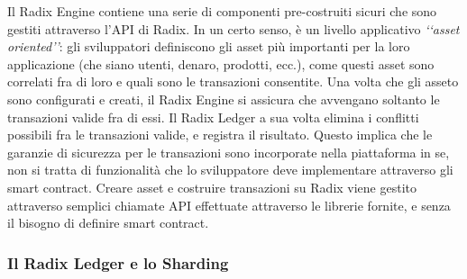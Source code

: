Il Radix Engine contiene una serie di componenti pre-costruiti sicuri che sono gestiti attraverso l'API di Radix. In un certo senso, è un livello applicativo \textit{‘‘asset oriented’’}: gli sviluppatori definiscono gli asset più importanti per la loro applicazione (che siano utenti, denaro, prodotti, ecc.), come questi asset sono correlati fra di loro e quali sono le transazioni consentite. Una volta che gli asseto sono configurati e creati, il Radix Engine si assicura che avvengano soltanto le transazioni valide fra di essi. Il Radix Ledger a sua volta elimina i conflitti possibili fra le transazioni valide, e registra il risultato. Questo implica che le garanzie di sicurezza per le transazioni sono incorporate nella piattaforma in se, non si tratta di funzionalità che lo sviluppatore deve implementare attraverso gli smart contract.
Creare asset e costruire transazioni su Radix viene gestito attraverso semplici chiamate API effettuate attraverso le librerie fornite, e senza il bisogno di definire smart contract.

\subsubsection{Il Radix Ledger e lo Sharding}

